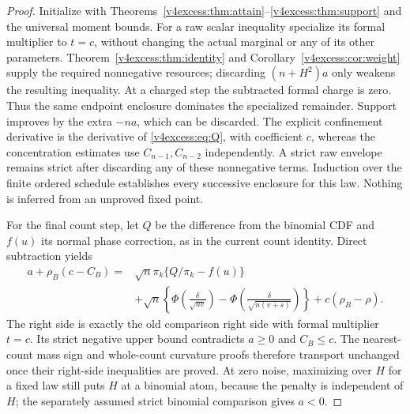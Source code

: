 \begin{proof}
Initialize with Theorems~\ref{v4excess:thm:attain}--\ref{v4excess:thm:support} and the
universal moment bounds. For a raw scalar inequality specialize its
formal multiplier to $t=c$, without changing the actual marginal or any
of its other parameters. Theorem~\ref{v4excess:thm:identity} and
Corollary~\ref{v4excess:cor:weight} supply the required nonnegative resources;
discarding $(n+H^2)a$ only weakens the resulting inequality. At a charged
step the subtracted formal charge is zero. Thus the same endpoint
enclosure dominates the specialized remainder. Support improves by the
extra $-na$, which can be discarded. The explicit confinement derivative
is the derivative of \eqref{v4excess:eq:Q}, with coefficient $c$, whereas the
concentration estimates use $C_{n-1},C_{n-2}$ independently. A strict
raw envelope remains strict after discarding any of these nonnegative
terms. Induction over the finite ordered schedule establishes every
successive enclosure for this law. Nothing is inferred from an unproved
fixed point.

For the final count step, let $Q$ be the difference from the binomial
CDF and $f(u)$ its normal phase correction, as in the current count
identity. Direct subtraction yields
\begin{equation}\label{v4excess:eq:transport-master}
 \begin{aligned}
 a+\rho_B(c-C_B)={}&\sqrt n\pi_k\{Q/\pi_k-f(u)\}\\
 &+\sqrt n\left\{\Phi\!\left(\frac{\delta}{\sqrt{nv}}\right)
  -\Phi\!\left(\frac{\delta}{\sqrt{n(v+s)}}\right)\right\}
 +c(\rho_B-\rho).
 \end{aligned}
\end{equation}
The right side is exactly the old comparison right side with formal
multiplier $t=c$. Its strict negative upper bound contradicts $a\ge0$
and $C_B\le c$. The nearest-count mass sign and whole-count curvature
proofs therefore transport unchanged once their right-side inequalities
are proved. At zero noise, maximizing over $H$ for a fixed law still
puts $H$ at a binomial atom, because the penalty is independent of $H$;
the separately assumed strict binomial comparison gives $a<0$.
\end{proof}

